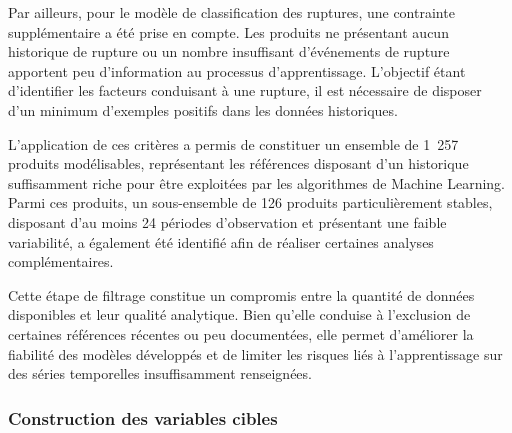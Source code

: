Par ailleurs, pour le modèle de classification des ruptures, une contrainte supplémentaire a été prise en compte. Les produits ne présentant aucun historique de rupture ou un nombre insuffisant d'événements de rupture apportent peu d'information au processus d'apprentissage. L'objectif étant d'identifier les facteurs conduisant à une rupture, il est nécessaire de disposer d'un minimum d'exemples positifs dans les données historiques.
 
L'application de ces critères a permis de constituer un ensemble de 1~257 produits modélisables, représentant les références disposant d'un historique suffisamment riche pour être exploitées par les algorithmes de Machine Learning. Parmi ces produits, un sous-ensemble de 126 produits particulièrement stables, disposant d'au moins 24 périodes d'observation et présentant une faible variabilité, a également été identifié afin de réaliser certaines analyses complémentaires.
 
Cette étape de filtrage constitue un compromis entre la quantité de données disponibles et leur qualité analytique. Bien qu'elle conduise à l'exclusion de certaines références récentes ou peu documentées, elle permet d'améliorer la fiabilité des modèles développés et de limiter les risques liés à l'apprentissage sur des séries temporelles insuffisamment renseignées.
 
\begin{table}[H]
\renewcommand{\arraystretch}{1.2}
\centering
\caption{Critères de sélection des produits modélisables}
\label{tab:ch4:criteres_selection}
\end{table}
 
\subsubsection{Construction des variables cibles}
 
